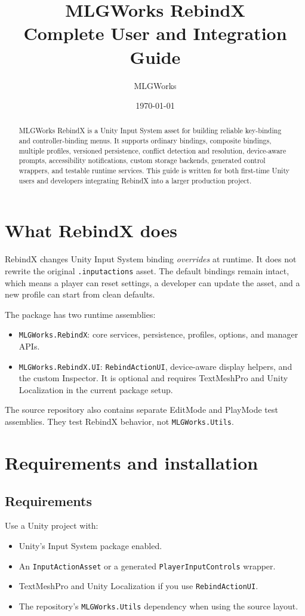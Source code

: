 \documentclass[11pt,a4paper]{article}
\title{\textbf{MLGWorks RebindX}\\[0.4em]\large Complete User and Integration Guide}
\author{MLGWorks}
\date{\today}
\newcommand{\class}[1]{\texttt{#1}}
\newcommand{\pathref}[1]{\texttt{#1}}
\begin{document}
\maketitle
\begin{abstract}
MLGWorks RebindX is a Unity Input System asset for building reliable key-binding and controller-binding menus. It supports ordinary bindings, composite bindings, multiple profiles, versioned persistence, conflict detection and resolution, device-aware prompts, accessibility notifications, custom storage backends, generated control wrappers, and testable runtime services. This guide is written for both first-time Unity users and developers integrating RebindX into a larger production project.
\end{abstract}
\tableofcontents
\newpage

\section{What RebindX does}
RebindX changes Unity Input System binding \emph{overrides} at runtime. It does not rewrite the original \pathref{.inputactions} asset. The default bindings remain intact, which means a player can reset settings, a developer can update the asset, and a new profile can start from clean defaults.

The package has two runtime assemblies:
\begin{itemize}[nosep]
  \item \class{MLGWorks.RebindX}: core services, persistence, profiles, options, and manager APIs.
  \item \class{MLGWorks.RebindX.UI}: \class{RebindActionUI}, device-aware display helpers, and the custom Inspector. It is optional and requires TextMeshPro and Unity Localization in the current package setup.
\end{itemize}

The source repository also contains separate EditMode and PlayMode test assemblies. They test RebindX behavior, not \class{MLGWorks.Utils}.

\section{Requirements and installation}
\subsection{Requirements}
Use a Unity project with:
\begin{itemize}
  \item Unity's Input System package enabled.
  \item An \class{InputActionAsset} or a generated \class{PlayerInputControls} wrapper.
  \item TextMeshPro and Unity Localization if you use \class{RebindActionUI}.
  \item The repository's \class{MLGWorks.Utils} dependency when using the source layout.
\end{itemize}
\end{document}
